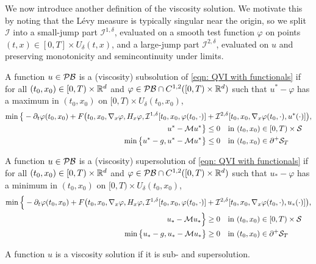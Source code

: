 We now introduce another definition of the viscosity solution. We motivate this by noting that the Lévy measure is typically singular near the origin, so we split $\mathcal I$ into a small-jump part $\mathcal I^{1,\delta}$, evaluated on a smooth test function $\varphi$ on points $(t,x) \in [0,T] \times U_\delta(t,x)$, and a large-jump part $\mathcal I^{2,\delta}$, evaluated on $u$ and preserving monotonicity and semincontinuity under limits. 

\begin{definition}
\label{def: Viscosity solution 2}
    A function $u \in \mathcal{PB}$ is a (viscosity) subsolution of \eqref{eqn: QVI with functionals} if for all $(t_0,x_0) \in [0,T) \times \mathbb{R}^d$ and $\varphi \in \mathcal{PB} \cap C^{1,2}([0,T) \times \mathbb{R}^d)$ such that $u^* - \varphi$ has a maximum in $(t_0,x_0)$ on $[0,T) \times U_{\delta}(t_0,x_0)$,
    \begin{equation*}
        \begin{aligned}
            \min \big\{-\partial_t\varphi(t_0,x_0) + F\big( t_0,x_0, \nabla_x \varphi, H_x \varphi, \mathcal{I}^{1,\delta}[t_0,x_0,\varphi(t_0,\cdot)] &+ \mathcal{I}^{2,\delta}[t_0,x_0,\nabla_x \varphi(t_0,\cdot), u^*(\cdot)] \big), \\
            u^*-\mathcal{M} u^* \big\} &\leq 0 \quad \text{in } (t_0,x_0) \in [0,T)\times \mathcal{S} \\
            \min \big\{ u^* - g, u^* - \mathcal{M} u^* \big\} &\leq 0 \quad  \text{in } (t_0,x_0) \in \partial^+ \mathcal{S}_T
        \end{aligned}
    \end{equation*}
    
    A function $u \in \mathcal{PB}$ is a (viscosity) supersolution of \eqref{eqn: QVI with functionals} if for all $(t_0,x_0) \in [0,T) \times \mathbb{R}^d$ and $\varphi \in \mathcal{PB} \cap C^{1,2}([0,T) \times \mathbb{R}^d)$ such that $u_* - \varphi$ has a minimum in $(t_0,x_0)$ on $[0,T) \times U_{\delta}(t_0,x_0)$,
    \begin{align*}
        \min \Big\{ - \partial_t \varphi(t_0,x_0) + F\big( t_0,x_0, \nabla_x \varphi, H_x \varphi, \mathcal{I}^{1,\delta}[t_0,x_0,\varphi(t_0,\cdot)] &+ \mathcal{I}^{2,\delta}[t_0,x_0,\nabla_x \varphi(t_0,\cdot), u_*(\cdot)] \big), \\
        u_*-\mathcal{M} u_* \Big\} &\geq 0 \quad \text{in } (t_0,x_0) \in [0,T)\times \mathcal{S} \\
        \min \big\{ u_* - g, u_* - \mathcal{M} u_* \big\} &\geq 0 \quad \text{in } (t_0,x_0) \in \partial^+ \mathcal{S}_T
    \end{align*}

    A function $u$ is a viscosity solution if it is sub- and supersolution. 
\end{definition}

